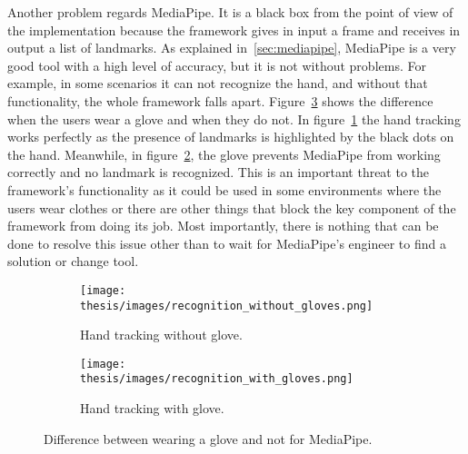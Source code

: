 \documentclass[../thesis.tex]{subfiles}
\begin{document}
Another problem regards MediaPipe. It is a black box from the point of view of the implementation because the framework gives in input a frame and receives in output a list of landmarks. As explained in~\ref{sec:mediapipe}, MediaPipe is a very good tool with a high level of accuracy, but it is not without problems. For example, in some scenarios it can not recognize the hand, and without that functionality, the whole framework falls apart. Figure~\ref{fig:ht_with_and_without_glove} shows the difference when the users wear a glove and when they do not. In figure~\ref{fig:ht_without_gloves} the hand tracking works perfectly as the presence of landmarks is highlighted by the black dots on the hand. Meanwhile, in figure~\ref{fig:ht_with_gloves}, the glove prevents MediaPipe from working correctly and no landmark is recognized. This is an important threat to the framework's functionality as it could be used in some environments where the users wear clothes or there are other things that block the key component of the framework from doing its job. Most importantly, there is nothing that can be done to resolve this issue other than to wait for MediaPipe's engineer to find a solution or change tool.
\begin{figure}
    \centering
    \begin{subfigure}[b]{1\textwidth}
        \centering
        \texttt{[image: thesis/images/recognition\_without\_gloves.png]}
        \caption{Hand tracking without glove.}
        \label{fig:ht_without_gloves}
    \end{subfigure}
    \hfill
    \begin{subfigure}[b]{1\textwidth}
        \centering
        \texttt{[image: thesis/images/recognition\_with\_gloves.png]}
        \caption{Hand tracking with glove.}
        \label{fig:ht_with_gloves}
    \end{subfigure}
    \caption{Difference between wearing a glove and not for MediaPipe.}
    \label{fig:ht_with_and_without_glove}
\end{figure}
\end{document}
